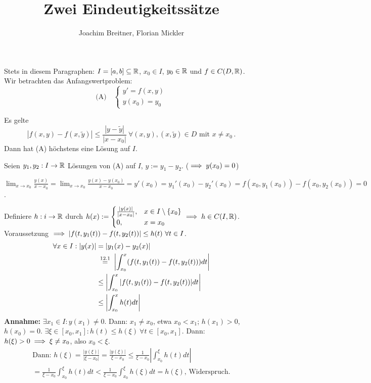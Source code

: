 \documentclass{article}
\title{Zwei Eindeutigkeitssätze}
\author{Joachim Breitner, Florian Mickler}
\begin{document}
\maketitle

Stets in diesem Paragraphen: $I=[a,b]\subseteq\mathbb{R}$, $x_0\in I$, $y_0\in\mathbb{R}$ und $f\in C(D,\mathbb{R})$. Wir betrachten das Anfangswertproblem:
\[ \text{(A)} \quad 
\begin{cases}
y'=f(x,y) \\ y(x_0) = y_0
\end{cases}
\]

\begin{satz}
Es gelte \[|f(x,y) - f(x,\tilde y)| \le \frac{|y-\tilde y|}{|x-x_0|} \ \forall (x,y),(x,\tilde y)\in D\text{ mit }x\ne x_0\,.\]
Dann hat (A) höchstens eine Lösung auf $I$.
\end{satz}

\begin{beweis}
Seien $y_1,y_2: I \to \mathbb{R}$ Lösungen von (A) auf $I$, $y:= y_1-y_2$. ($\implies y(x_0)=0$)

$\lim_{x\to x_0} \frac{y(x)}{x-x_0} = \lim_{x\to x_0} \frac{y(x) - y(x_0)}{x-x_0} = y'(x_0) = y_1'(x_0) - y_2'(x_0) = f(x_0,y_1(x_0))  - f(x_0,y_2(x_0)) = 0$.

Definiere $h:i\to\mathbb{R}$ durch $h(x) := 
\begin{cases}
\frac{|y(x)|}{|x-x_0|}, & x\in I\setminus\{x_0\}\\
0, &x=x_0
\end{cases} \implies h \in C(I,\mathbb{R})
$. Voraussetzung $\folgt |f(t,y_1(t)) - f(t,y_2(t))| \le h(t) \ \forall t\in I$.
\begin{align*}
\forall x\in I: |y(x)| &=|y_1(x) - y_2(x)| \\
&\gleichnach{12.1} \left|\int_{x_0}^x (f(t,y_1(t)) - f(t,y_2(t))) dt \right| \\
&\le \left| \int_{x_0}^x |f(t,y_1(t)) - f(t,y_2(t))| dt \right| \\
&\le \left|\int_{x_0}^x h(t) dt\right|
\end{align*}
\textbf{Annahme:} $\exists x_1 \in I: y(x_1)\ne0$. Dann: $x_1\ne x_0$, etwa $x_0<x_1$; $h(x_1) >0$, $h(x_0) = 0$. $\exists \xi \in [x_0,x_1]: h(t) \le h(\xi) \ \forall t\in[x_0,x_1]$. Dann: $h(\xi) > 0 \implies \xi \ne x_0$, also $x_0 < \xi$.
\begin{multline*}
\text{Dann: }h(\xi) = \frac{|y(\xi)|}{|\xi-x_0|} = \frac{|y(\xi)|}{\xi-x_0} 
\le \frac1{\xi-x_0} \left|\int_{x_0}^\xi h(t) dt \right|\\ = \frac{1}{\xi-x_0} \int_{x_0}^\xi h(t) dt < \frac1{\xi-x_0} \int_{x_0}^\xi h(\xi) dt = h(\xi)\text{, Widerspruch.}
\end{multline*}
\end{beweis}
\end{document}
